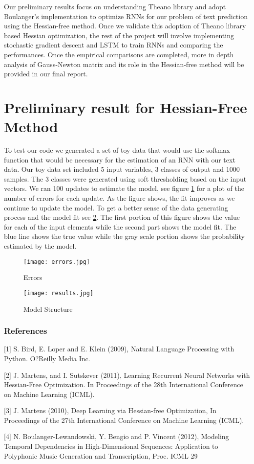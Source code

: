 \documentclass{article} %
\begin{document}
Our preliminary results focus on understanding Theano library and adopt Boulanger's implementation to optimize RNNs for our problem of text prediction using the Hessian-free method. Once we validate this adoption of Theano library based Hessian optimization, the rest of the project will involve implementing stochastic gradient descent and LSTM to train RNNs and comparing the performances. Once the empirical comparisons are completed, more in depth analysis of Gauss-Newton matrix and its role in the Hessian-free method will be provided in our final report.

\section{Preliminary result for Hessian-Free Method}

To test our code we generated a set of toy data that would use the softmax function that would be necessary for the estimation of an RNN with our text data.  Our toy data set included 5 input variables, 3 classes of output and 1000 samples.  The 3 classes were generated using soft thresholding based on the input vectors.  We ran 100 updates to estimate the model, see figure \ref{fig:error} for a plot of the number of errors for each update.  As the figure shows, the fit improves as we continue to update the model.  To get a better sense of the data generating process and the model fit see \ref{fig:structure}.  The first portion of this figure shows the value for each of the input elements while the second part shows the model fit.  The blue line shows the true value while the gray scale portion shows the probability estimated by the model.

\begin{figure}
\centering
\caption{Errors}
\texttt{[image: errors.jpg]}
\label{fig:error}
\end{figure}

\begin{figure}
\centering
\caption{Model Structure}
\texttt{[image: results.jpg]}
\label{fig:structure}
\end{figure}

\subsubsection*{References}


\small{
[1] S. Bird, E. Loper and E. Klein (2009), Natural Language Processing with Python. O?Reilly Media Inc.

[2] J. Martens, and I. Sutskever (2011), Learning Recurrent Neural Networks with Hessian-Free Optimization. In Proceedings of the 28th International Conference on Machine Learning (ICML).

[3] J. Martens (2010), Deep Learning via Hessian-free Optimization, In Proceedings of the 27th International Conference on Machine Learning (ICML).

[4] N. Boulanger-Lewandowski, Y. Bengio and P. Vincent (2012), Modeling Temporal Dependencies in High-Dimensional Sequences: Application to Polyphonic Music Generation and Transcription, Proc. ICML 29
}
\end{document}
